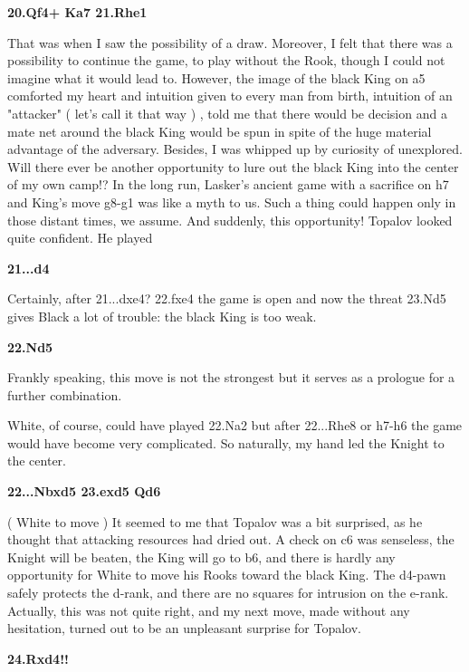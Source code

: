 \documentclass[
	11pt,twocolumn]{article}
\renewcommand{\bf}{\bfseries}
\begin{document}
{\bf 20.Qf4+ Ka7 21.Rhe1 }

That was when I saw the possibility of a draw. Moreover, I felt that there was a possibility to continue the game, to play without the Rook, though I could not imagine what it would lead to. However, the image of the black King on a5 comforted my heart and intuition given to every man from birth, intuition of an "attacker" ( let's call it that way ) , told me that there would be decision and a mate net around the black King would be spun in spite of the huge material advantage of the adversary. Besides, I was whipped up by curiosity of unexplored. Will there ever be another opportunity to lure out the black King into the center of my own camp!? In the long run, Lasker's ancient game with a sacrifice on h7 and King's move g8-g1 was like a myth to us. Such a thing could happen only in those distant times, we assume. And suddenly, this opportunity! Topalov looked quite confident. He played

{\bf 21...d4 }

Certainly, after 21...dxe4? 22.fxe4 the game is open and now the threat 23.Nd5 gives Black a lot of trouble: the black King is too weak. 

{\bf 22.Nd5 }

Frankly speaking, this move is not the strongest but it serves as a prologue for a further combination.



White, of course, could have played 22.Na2  but after 22...Rhe8 or h7-h6 the game would have become very complicated. So naturally, my hand led the Knight to the center. 

{\bf 22...Nbxd5 23.exd5 Qd6 }

( White to move ) It seemed to me that Topalov was a bit surprised, as he thought that attacking resources had dried out. A check on c6 was senseless, the Knight will be beaten, the King will go to b6, and there is hardly any opportunity for White to move his Rooks toward the black King. The d4-pawn safely protects the d-rank, and there are no squares for intrusion on the e-rank. Actually, this was not quite right, and my next move, made without any hesitation, turned out to be an unpleasant surprise for Topalov.

{\bf 24.Rxd4!! }
\end{document}
